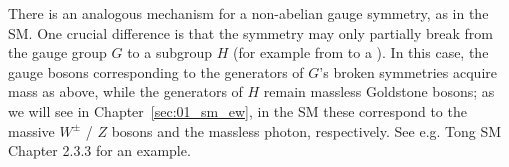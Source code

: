 There is an analogous mechanism for a non-abelian gauge symmetry, as in the SM.
One crucial difference is that the symmetry may only partially break from the gauge group $G$ to a subgroup $H$ (for example from \SU[2] to a \UU[1]).
In this case, the gauge bosons corresponding to the generators of $G$'s broken symmetries acquire mass as above, while the generators of $H$ remain massless Goldstone bosons; as we will see in Chapter~\ref{sec:01_sm_ew}, in the SM these correspond to the massive $W^\pm$ / $Z$ bosons and the massless photon, respectively.
See e.g. Tong SM~\cite{TongSM} Chapter 2.3.3 for an example.



